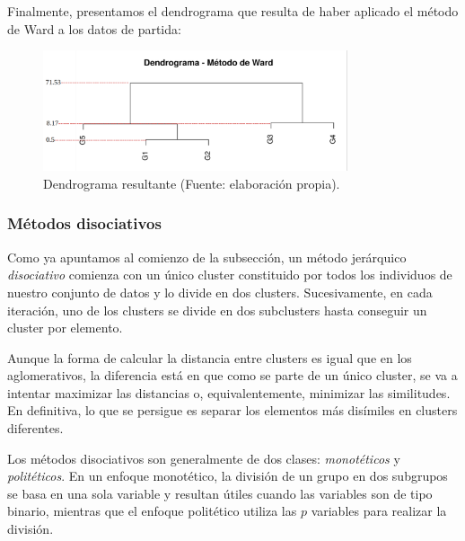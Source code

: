 \begin{ejemplo}
\begin{table}[h]
    \end{table}

    Finalmente, presentamos el dendrograma que resulta de haber aplicado el método de Ward a los datos de partida:

    \begin{figure}[h]
        \centering
        \includegraphics[width=0.8\textwidth]{../img/dendrograma.png}
        \caption{Dendrograma resultante (Fuente: elaboración propia).}
    \end{figure}

\end{ejemplo}


\subsubsection{Métodos disociativos}

Como ya apuntamos al comienzo de la subsección, un método jerárquico \textit{disociativo} comienza con un único cluster constituido por todos los individuos
de nuestro conjunto de datos y lo divide en dos clusters. Sucesivamente, en cada iteración, uno de los clusters se divide en dos subclusters hasta conseguir
un cluster por elemento. \newline

Aunque la forma de calcular la distancia entre clusters es igual que en los aglomerativos, la diferencia está en que como se parte de un único cluster, se va
a intentar maximizar las distancias o, equivalentemente, minimizar las similitudes. En definitiva, lo que se persigue es separar los elementos más disímiles en 
clusters diferentes. \newline

Los métodos disociativos son generalmente de dos clases: \textit{monotéticos} y \textit{politéticos}. En un enfoque monotético, la división de un grupo en dos 
subgrupos se basa en una sola variable y resultan útiles cuando las variables son de tipo binario, mientras que el enfoque politético utiliza las $p$ 
variables para realizar la división. \newline

